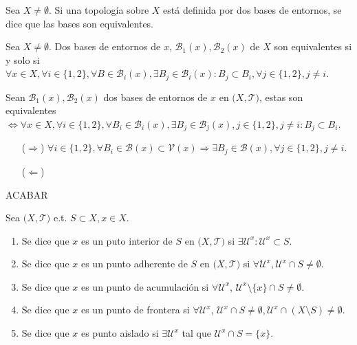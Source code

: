 \begin{defn}
  Sea $X \neq \emptyset$. Si una topología sobre $X$ está definida por dos bases de entornos, se dice que las bases son equivalentes.
\end{defn}

\begin{prop}
  Sea $X \neq \emptyset$. Dos bases de entornos de $x$, $\mathcal{B}_{1}(x), \mathcal{B}_{2}(x)$ de $X$ son equivalentes si y solo si $\forall x \in X, \forall i \in \{ 1,2 \}, \forall B \in \mathcal{B}_{i}(x), \exists B_{j} \in \mathcal{B}_{i}(x): B_{j} \subset B_{i}, \forall j \in \{ 1,2 \}, j \neq i$.
\end{prop}

\begin{prop}
Sean $\mathcal{B}_{1}(x), \mathcal{B}_{2}(x)$ dos bases de entornos de $x$ en $\big( X, \mathcal{T} \big)$, estas son equivalentes $\Leftrightarrow \forall x \in X, \forall i \in \{ 1, 2 \}, \forall B_{i} \in \mathcal{B}_{i}(x), \exists B_{j} \in \mathcal{B}_{j}(x), j \in \{ 1, 2 \}, j \neq i : B_{j} \subset B_{i}$.
\end{prop}

\begin{dem}
  \begin{enumerate}[label=(\roman*)]
    \item [($\Rightarrow$)] $\forall i \in \{ 1,2 \}, \forall B_{i} \in \mathcal{B}(x) \subset \mathcal{V}(x) \Rightarrow \exists B_{j} \in \mathcal{B}(x), \forall j \in \{  1,2 \}, j \neq i$.
    \item [($\Leftarrow$)]
  \end{enumerate} ACABAR
\end{dem}

\begin{defn}
  Sea $\big( X, \mathcal{T} \big)$ e.t. $S \subset X, x \in X$.
  \begin{enumerate}[label=(\roman*)]
    \item Se dice que $x$ es un puto interior de $S$ en $\big( X, \mathcal{T} \big)$ si $\exists \mathcal{U}^{x}: \mathcal{U}^{x} \subset S$.
    \item Se dice que $x$ es un punto adherente de $S$ en $\big( X, \mathcal{T} \big)$ si $\forall \mathcal{U}^{x}, \mathcal{U}^{x} \cap S \neq \emptyset$.
    \item Se dice que $x$ es un punto de acumulación si $\forall \mathcal{U}^{x}$, $ \mathcal{U}^{x} \setminus \{ x \} \cap S \neq \emptyset$.
    \item Se dice que $x$ es un punto de frontera si $ \forall \mathcal{U}^{x}$, $ \mathcal{U}^{x}\cap S \neq  \emptyset, \mathcal{U}^{x} \cap (X \setminus S) \neq \emptyset$.
    \item Se dice que $x$ es punto aislado si $ \exists \mathcal{U}^{x}$ tal que $\mathcal{U}^{x} \cap S = \{ x \}$.
  \end{enumerate}
\end{defn}

